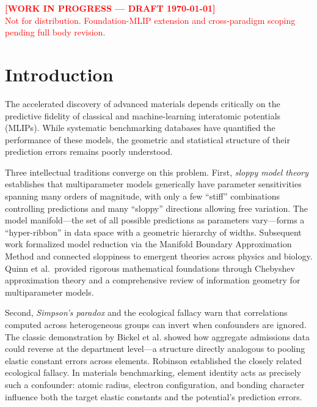 \documentclass[twocolumn,9pt]{extarticle}
\begin{document}
\maketitle
\thispagestyle{fancy}

\begin{center}
\textcolor{red}{\bfseries\large [WORK IN PROGRESS --- DRAFT \today]}\\
\textcolor{red}{\small Not for distribution. Foundation-MLIP extension and cross-paradigm scoping pending full body revision.}
\end{center}

\section{Introduction}

The accelerated discovery of advanced materials depends critically on the predictive fidelity of classical and machine-learning interatomic potentials (MLIPs)\cite{frederiksen2004,mortensen2005}. While systematic benchmarking databases have quantified the performance of these models\cite{kurniawan2022,openkim}, the geometric and statistical structure of their prediction errors remains poorly understood.

Three intellectual traditions converge on this problem. First, \textit{sloppy model theory} establishes that multiparameter models generically have parameter sensitivities spanning many orders of magnitude, with only a few ``stiff'' combinations controlling predictions and many ``sloppy'' directions allowing free variation\cite{brown2003,waterfall2006,gutenkunst2007}. The model manifold---the set of all possible predictions as parameters vary---forms a ``hyper-ribbon'' in data space with a geometric hierarchy of widths\cite{transtrum2010,transtrum2011,machta2013}. Subsequent work formalized model reduction via the Manifold Boundary Approximation Method\cite{transtrum2014} and connected sloppiness to emergent theories across physics and biology\cite{transtrum2015}. Quinn et al.\ provided rigorous mathematical foundations through Chebyshev approximation theory\cite{quinn2019} and a comprehensive review of information geometry for multiparameter models\cite{quinn2023}.

Second, \textit{Simpson's paradox} and the ecological fallacy warn that correlations computed across heterogeneous groups can invert when confounders are ignored\cite{simpson1951,blyth1972,pearl2014}. The classic demonstration by Bickel et al.\cite{bickel1975} showed how aggregate admissions data could reverse at the department level---a structure directly analogous to pooling elastic constant errors across elements. Robinson\cite{robinson1950} established the closely related ecological fallacy. In materials benchmarking, element identity acts as precisely such a confounder: atomic radius, electron configuration, and bonding character influence both the target elastic constants and the potential's prediction errors\cite{pearl2009}.
\end{document}
